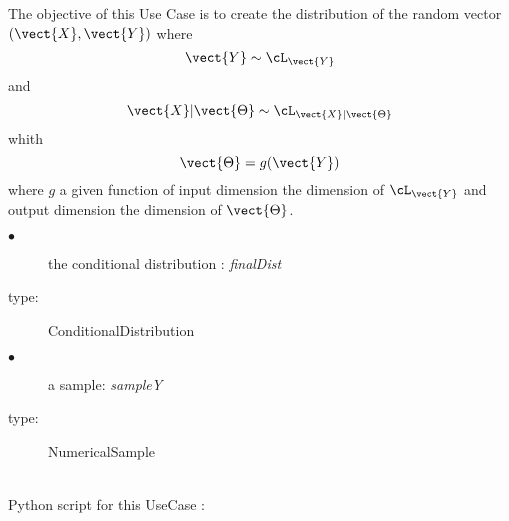 \renewcommand{\filename}{docUC_InputBayesian_BayesDist.tex}
\renewcommand{\filetitle}{UC : Creation of a multivariate distribution through conditioning}

\HeaderIIILevel




The objective of this Use Case is to create  the distribution of the random vector $(\vect{X},\vect{Y})$ where $$\vect{Y} \sim \cL_{\vect{Y}}$$ and $$\vect{X}|\vect{\Theta} \sim \cL_{\vect{X}|\vect{\Theta}}$$  whith $$\vect{\Theta}=g(\vect{Y})$$ where $g$ a given function of input dimension the dimension of $\cL_{\vect{Y}}$ and output dimension the dimension of $\vect{\Theta}$.


{
  \begin{description}
  \item[$\bullet$] the conditional distribution : {\itshape  finalDist}
  \item[type:]  ConditionalDistribution
  \item[$\bullet$] a sample: {\itshape sampleY}
  \item[type:]  NumericalSample
  \end{description}
}

\textspace\\
Python script for this UseCase :

